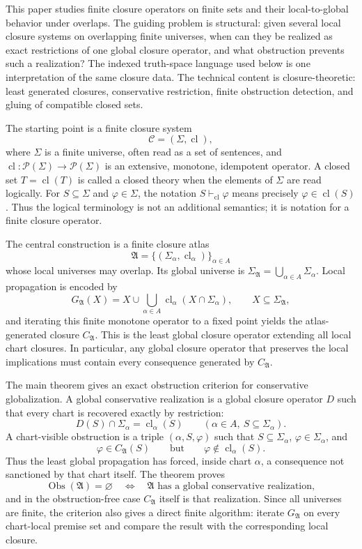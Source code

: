 \documentclass[11pt]{amsart}
\numberwithin{equation}{section}
\theoremstyle{plain}
\theoremstyle{definition}
\theoremstyle{remark}
\newcommand{\Pow}{\mathcal P}
\newcommand{\Cl}{\operatorname{cl}}
\newcommand{\C}{\mathcal C}
\newcommand{\A}{\mathfrak A}
\newcommand{\Sig}{\Sigma}
\newcommand{\Obs}{\operatorname{Obs}}
\begin{document}
This paper studies finite closure operators on finite sets and their local-to-global behavior under overlaps.  The guiding problem is structural: given several local closure systems on overlapping finite universes, when can they be realized as exact restrictions of one global closure operator, and what obstruction prevents such a realization?  The indexed truth-space language used below is one interpretation of the same closure data.  The technical content is closure-theoretic: least generated closures, conservative restriction, finite obstruction detection, and gluing of compatible closed sets.

The starting point is a finite closure system
\[
  \C=(\Sig,\Cl),
\]
where \(\Sig\) is a finite universe, often read as a set of sentences, and \(\Cl:\Pow(\Sig)\to\Pow(\Sig)\) is an extensive, monotone, idempotent operator.  A closed set \(T=\Cl(T)\) is called a closed theory when the elements of \(\Sig\) are read logically.  For \(S\subseteq\Sig\) and \(\varphi\in\Sig\), the notation \(S\vdash_{\Cl}\varphi\) means precisely \(\varphi\in\Cl(S)\).  Thus the logical terminology is not an additional semantics; it is notation for a finite closure operator.

The central construction is a finite closure atlas
\[
  \A=\{(\Sig_\alpha,\Cl_\alpha)\}_{\alpha\in A}
\]
whose local universes may overlap.  Its global universe is \(\Sig_{\A}=\bigcup_{\alpha\in A}\Sig_\alpha\).  Local propagation is encoded by
\[
  G_{\A}(X)=X\cup \bigcup_{\alpha\in A}
       \Cl_\alpha(X\cap \Sig_\alpha),
  \qquad X\subseteq\Sig_{\A},
\]
and iterating this finite monotone operator to a fixed point yields the atlas-generated closure \(C_{\A}\).  This is the least global closure operator extending all local chart closures.  In particular, any global closure operator that preserves the local implications must contain every consequence generated by \(C_{\A}\).

The main theorem gives an exact obstruction criterion for conservative globalization.  A global conservative realization is a global closure operator \(D\) such that every chart is recovered exactly by restriction:
\[
  D(S)\cap\Sig_\alpha=\Cl_\alpha(S)
  \qquad(\alpha\in A,\ S\subseteq\Sig_\alpha).
\]
A chart-visible obstruction is a triple \((\alpha,S,\varphi)\) such that \(S\subseteq\Sig_\alpha\), \(\varphi\in\Sig_\alpha\), and
\[
  \varphi\in C_{\A}(S)
  \qquad\text{but}\qquad
  \varphi\notin \Cl_\alpha(S).
\]
Thus the least global propagation has forced, inside chart \(\alpha\), a consequence not sanctioned by that chart itself.  The theorem proves
\[
  \Obs(\A)=\varnothing
  \quad\Longleftrightarrow\quad
  \A\text{ has a global conservative realization},
\]
and in the obstruction-free case \(C_{\A}\) itself is that realization.  Since all universes are finite, the criterion also gives a direct finite algorithm: iterate \(G_{\A}\) on every chart-local premise set and compare the result with the corresponding local closure.
\end{document}
